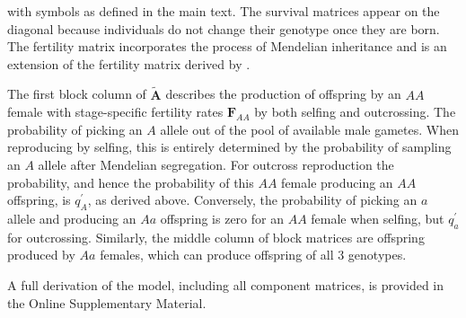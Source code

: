 \documentclass[11pt]{article}
\def\mbf#1{\mathbf{#1}}
\begin{document}
\noindent with symbols as defined in the main text. The survival matrices appear on the diagonal because individuals do not change their genotype once they are born. The fertility matrix incorporates the process of Mendelian inheritance and is an extension of the fertility matrix derived by \citet{deVriesCaswell2019a}.

The first block column of $\tilde{\mbf{A}}$ describes the production of offspring by an $AA$ female with stage-specific fertility rates $\mbf{F}_{AA}$ by both selfing and outcrossing. The probability of picking an $A$ allele out of the pool of available male gametes. When reproducing by selfing, this is entirely determined by the probability of sampling an $A$ allele after Mendelian segregation. For outcross reproduction the probability, and hence the probability of this $AA$ female producing an $AA$ offspring, is $q^{\prime}_{A}$, as derived above. Conversely, the probability of picking an $a$ allele and producing an $Aa$ offspring is zero for an $AA$ female when selfing, but $q^{\prime}_a$ for outcrossing. Similarly, the middle column of block matrices are offspring produced by $Aa$ females, which can produce offspring of all $3$ genotypes.

A full derivation of the model, including all component matrices, is provided in the Online Supplementary Material. 
\end{document}
